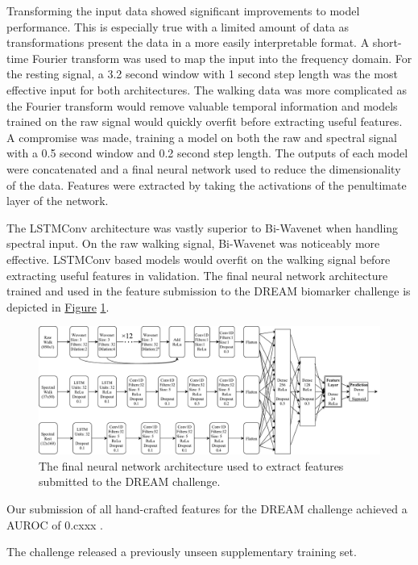 \documentclass[12pt, twoside]{book}
\begin{document}
Transforming the input data showed significant improvements to model performance. This is especially true with a limited amount of data as transformations present the data in a more easily interpretable format. A short-time Fourier transform was used to map the input into the frequency domain. For the resting signal, a 3.2 second window with 1 second step length was the most effective input for both architectures. The walking data was more complicated as the Fourier transform would remove valuable temporal information and models trained on the raw signal would quickly overfit before extracting useful features. A compromise was made, training a model on both the raw and spectral signal with a 0.5 second window and 0.2 second step length. The outputs of each model were concatenated and a final neural network used to reduce the dimensionality of the data. Features were extracted by taking the activations of the penultimate layer of the network.


The LSTMConv architecture was vastly superior to Bi-Wavenet when handling spectral input. On the raw walking signal, Bi-Wavenet was noticeably more effective. LSTMConv based models would overfit on the walking signal before extracting useful features in validation. The final neural network architecture trained and used in the feature submission to the DREAM biomarker challenge is depicted in \hyperref[finalarchitecture]{Figure} \ref{finalarchitecture}.


\begin{figure}[h]
	\label{finalarchitecture}
	
	\centering\centerline{\includegraphics[width=1.2\linewidth]{final_architecture.pdf}}
	\caption{The final neural network architecture used to extract features submitted to the DREAM challenge.}
\end{figure}

Our submission of all hand-crafted features for the DREAM challenge achieved a AUROC of 0.cxxx .

The challenge released a previously unseen supplementary training set. 
\end{document}
